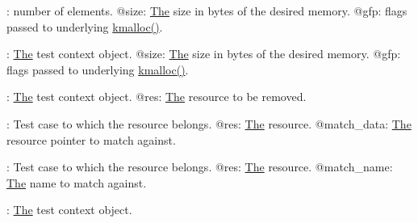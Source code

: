 \begin{DoxyRefList}
\+: number of elements. @size\+: \mbox{\hyperlink{classThe}{The}} size in bytes of the desired memory. @gfp\+: flags passed to underlying \mbox{\hyperlink{include_2linux_2slab_8h_a1d68b78a92a928652719a969b7f75f7c}{kmalloc()}}. 
\item[Member \mbox{\hyperlink{test_8h_a3fef4777242cd076176926419fac0e2b}{kunit\+\_\+kzalloc}} (struct kunit $\ast$test, size\+\_\+t size, gfp\+\_\+t gfp)]\label{test__test000018}%
%
\+: \mbox{\hyperlink{classThe}{The}} test context object. @size\+: \mbox{\hyperlink{classThe}{The}} size in bytes of the desired memory. @gfp\+: flags passed to underlying \mbox{\hyperlink{include_2linux_2slab_8h_a1d68b78a92a928652719a969b7f75f7c}{kmalloc()}}. 
\item[Member \mbox{\hyperlink{kunit_2test_8c_a11312bc8d902ca27515219836dda9040}{kunit\+\_\+remove\+\_\+resource}} (struct kunit $\ast$test, struct \mbox{\hyperlink{structkunit__resource}{kunit\+\_\+resource}} $\ast$res)]\label{test__test000014}%
%
\+: \mbox{\hyperlink{classThe}{The}} test context object. @res\+: \mbox{\hyperlink{classThe}{The}} resource to be removed. 
\item[Member \mbox{\hyperlink{test_8h_a67f0d4d0024a28cf4c88ad1f0fe7838e}{kunit\+\_\+resource\+\_\+instance\+\_\+match}} (struct kunit $\ast$test, struct \mbox{\hyperlink{structkunit__resource}{kunit\+\_\+resource}} $\ast$res, void $\ast$match\+\_\+data)]\label{test__test000009}%
%
\+: Test case to which the resource belongs. @res\+: \mbox{\hyperlink{classThe}{The}} resource. @match\+\_\+data\+: \mbox{\hyperlink{classThe}{The}} resource pointer to match against. 
\item[Member \mbox{\hyperlink{test_8h_a14304644a76b906d782b7473c0c7f484}{kunit\+\_\+resource\+\_\+name\+\_\+match}} (struct kunit $\ast$test, struct \mbox{\hyperlink{structkunit__resource}{kunit\+\_\+resource}} $\ast$res, void $\ast$match\+\_\+name)]\label{test__test000010}%
%
\+: Test case to which the resource belongs. @res\+: \mbox{\hyperlink{classThe}{The}} resource. @match\+\_\+name\+: \mbox{\hyperlink{classThe}{The}} name to match against.  
\item[Member \mbox{\hyperlink{test_8h_ae44c91724563027761cd6c90978bce9e}{K\+U\+N\+I\+T\+\_\+\+S\+U\+C\+C\+E\+ED}} (test)]\label{test__test000026}%
%
\+: \mbox{\hyperlink{classThe}{The}} test context object. 
\item[Class \mbox{\hyperlink{structkunit__try__catch}{kunit\+\_\+try\+\_\+catch}} ]\label{test__test000066}%

\end{DoxyRefList}
